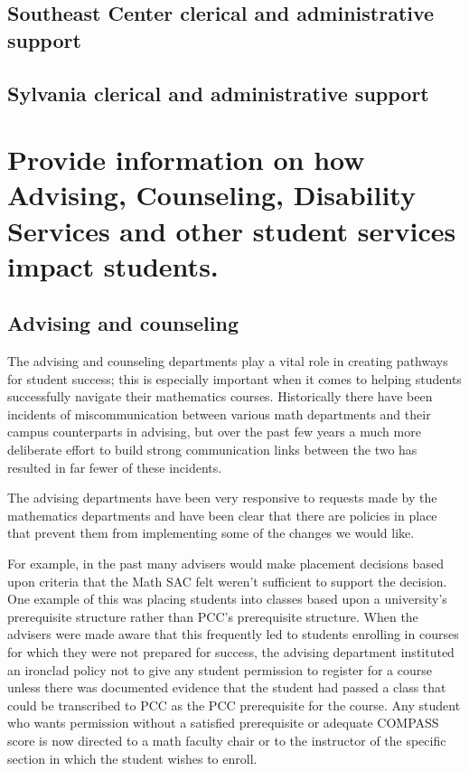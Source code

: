 \subsection{Southeast Center clerical and administrative support}

\subsection{Sylvania clerical and administrative support}


\section[Student services]{Provide information on how Advising, Counseling, Disability Services and other student services impact students. }
\subsection{Advising and counseling}
The advising and counseling departments play a vital role in creating pathways
for student success; this is especially important when it comes to helping
students successfully navigate their mathematics courses.  Historically there
have been incidents of miscommunication between various math departments and
their campus counterparts in advising, but over the past few years a much more
deliberate effort to build strong communication links  between the two has
resulted in far fewer of these incidents.

The advising departments have been very responsive to requests made by the
mathematics departments and have been clear that there are
policies in place that prevent them from implementing some of the changes we
would like.  

For example, in the past many advisers would make placement decisions based
upon criteria that the Math SAC felt weren't sufficient to support the
decision.   One example of this was placing students into classes based upon a
university's prerequisite structure rather than PCC's prerequisite structure.
When the advisers were made aware that this frequently led to students
enrolling in courses for which they were not prepared for success, the advising
department instituted an ironclad policy not to give any student permission to
register for a course unless there was documented evidence that the student had
passed a class that could be transcribed to PCC as the PCC prerequisite for
the course.  Any student who wants permission without a satisfied prerequisite
or adequate COMPASS score is now directed to a math faculty chair or to the
instructor of the specific section in which the student wishes to enroll.

